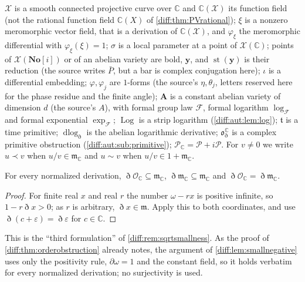 \documentclass[11pt,letterpaper]{article}
\numberwithin{equation}{section}
\theoremstyle{definition}
\theoremstyle{remark}
\newcommand{\SC}{\mathbf{No}[i]}
\newcommand{\C}{\mathbb C}
\newcommand{\der}{\partial}
\newcommand{\Ofin}{\mathcal O}
\newcommand{\mm}{\mathfrak m}
\newcommand{\Pcl}{\mathcal P}
\newcommand{\Obs}{\mathfrak o}
\newcommand{\st}{\operatorname{st}}
\newcommand{\Dn}{\eth}
\newcommand{\dlog}{\operatorname{dlog}}
\newcommand{\Log}{\operatorname{Log}}
\begin{document}
\begin{convention}
\label{diff:aut:conv:alphabet}
$\mathcal X$ is a smooth connected projective curve over $\C$ and $\C(\mathcal X)$
its function field (not the rational function field $\C(X)$ of
\cref{diff:thm:PVrational}); $\xi$ is a nonzero meromorphic vector field, that
is a derivation of $\C(\mathcal X)$, and $\varphi_{\xi}$ the meromorphic
differential with $\varphi_{\xi}(\xi)=1$; $\sigma$ is a local parameter at a point
of $\mathcal X(\C)$; points of $\mathcal X(\SC)$ or of an abelian variety are
bold, $\mathbf y$, and $\st(\mathbf y)$ is their reduction (the source writes
$\bar P$, but a bar is complex conjugation here); $\iota$ is a differential
embedding; $\varphi,\varphi_{j}$ are $1$-forms (the source's $\eta,\theta_{j}$,
letters reserved here for the phase residue and the finite angle); $\mathbf A$
is a constant abelian variety of dimension $d$ (the source's $A$), with formal
group law $\mathcal F$, formal logarithm $\log_{\mathcal F}$ and formal exponential
$\exp_{\mathcal F}$; $\Log$ is a strip logarithm (\cref{diff:aut:lem:log}); $\mathfrak t$
is a time primitive; $\dlog_{\Dn}$ is the abelian logarithmic derivative;
$\Obs^{\C}_{\Dn}$ is a complex primitive obstruction (\cref{diff:aut:sub:primitive});
$\Pcl_{\C}=\Pcl+i\Pcl$. For $v\neq0$ we write $u\prec v$ when
$u/v\in\mm_{\C}$ and $u\sim v$ when $u/v\in1+\mm_{\C}$.
\end{convention}

\begin{lemma}
\label{diff:aut:lem:small}
For every normalized derivation,
$\Dn\Ofin_{\C}\subseteq\mm_{\C}$, $\Dn\mm_{\C}\subseteq\mm_{\C}$ and
$\Dn\Ofin_{\C}=\Dn\mm_{\C}$.
\end{lemma}
\begin{proof}
For finite real $x$ and real $r$ the number $\omega-rx$ is positive infinite,
so $1-r\Dn x>0$; as $r$ is arbitrary, $\Dn x\in\mm$. Apply this to both
coordinates, and use $\Dn(c+\varepsilon)=\Dn\varepsilon$ for $c\in\C$.
\end{proof}

This is the ``third formulation'' of \cref{diff:rem:sqrtsmallness}. As the proof
of \cref{diff:thm:orderobstruction} already notes, the argument of
\cref{diff:lem:smallnegative} uses only the positivity rule, $\der\omega=1$ and
the constant field, so it holds verbatim for every normalized derivation; no
surjectivity is used.
\end{document}
